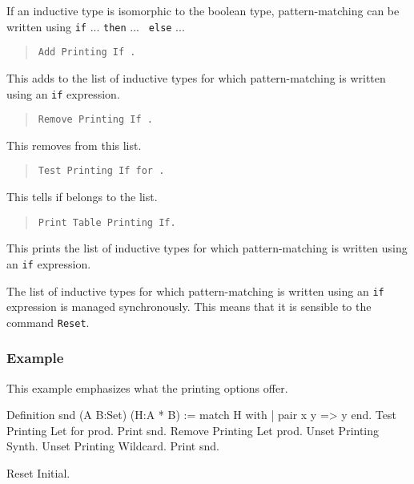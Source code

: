 If an inductive type is isomorphic to the boolean type,
pattern-matching can be written using {\tt if} ... {\tt then} ... {\tt
  else} ...

\begin{quote}
{\tt Add Printing If {\ident}.}
\end{quote}
This adds {\ident} to the list of inductive types for which
pattern-matching is written using an {\tt if} expression.

\begin{quote}
{\tt Remove Printing If {\ident}.}
\end{quote}
This removes {\ident} from this list.

\begin{quote}
{\tt Test Printing If for {\ident}.}
\end{quote}
This tells if {\ident} belongs to the list.

\begin{quote}
{\tt Print Table Printing If.}
\end{quote}
This prints the list of inductive types for which pattern-matching is
written using an {\tt if} expression.

The list of inductive types for which pattern-matching is written
using an {\tt if} expression is managed synchronously. This means that
it is sensible to the command {\tt Reset}.

\subsubsection{Example}

This example emphasizes what the printing options offer.

\begin{coq_example}
Definition snd (A B:Set) (H:A * B) := match H with
                                      | pair x y => y
                                      end.
Test Printing Let for prod.
Print snd.
Remove Printing Let prod.
Unset Printing Synth.
Unset Printing Wildcard.
Print snd.
\end{coq_example}
\begin{coq_eval}
Reset Initial.
\end{coq_eval}



